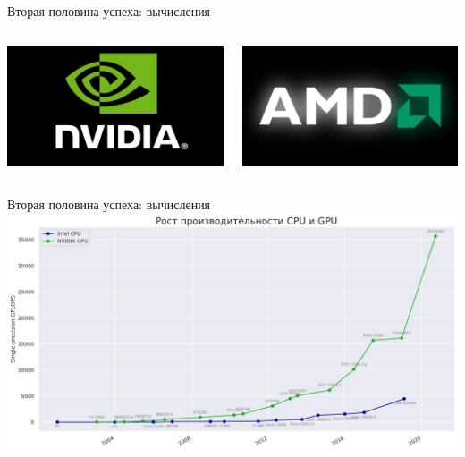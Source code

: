 \documentclass[aspectratio=169]{beamer}
\begin{document}
\begin{frame}{Вторая половина успеха: вычисления}
    \begin{columns}
        \begin{column}{.5\linewidth}
            \centering
            \includegraphics[width=\linewidth]{graphs/fig24_0.jpg}
        \end{column}
        \begin{column}{.5\linewidth}
            \centering
            \includegraphics[width=\linewidth]{graphs/fig24_1.jpg}
        \end{column}
    \end{columns}
\end{frame}

\begin{frame}{Вторая половина успеха: вычисления}
    \centering
    \includegraphics[width=.91\linewidth]{graphs/fig25.jpg}
\end{frame}
\end{document}

